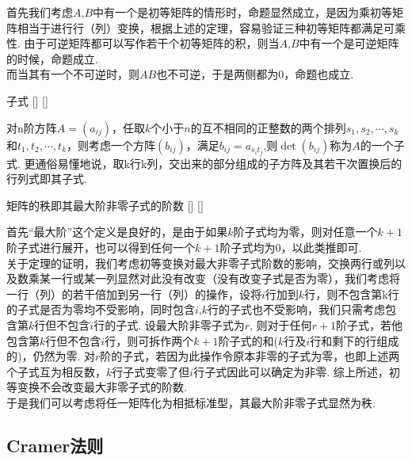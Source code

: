 \documentclass[UTF8]{ctexart}
\begin{document}
    \begin{prf}
        首先我们考虑$A$,$B$中有一个是初等矩阵的情形时，命题显然成立，是因为乘初等矩阵相当于进行行（列）变换，根据上述的定理，容易验证三种初等矩阵都满足可乘性. 由于可逆矩阵都可以写作若干个初等矩阵的积，则当$A$,$B$中有一个是可逆矩阵的时候，命题成立.\\
        而当其有一个不可逆时，则$AB$也不可逆，于是两侧都为0，命题也成立.
        
    \end{prf}
    \begin{dfn}
			[]
			{子式}
			[]
			[]

        对n阶方阵$A=(a_{ij})$，任取$k$个小于$n$的互不相同的正整数的两个排列$s_{1},s_2,\cdots,s_k$和$t_1,t_2,\cdots,t_k$，则考虑一个方阵$(b_{ij})$，满足$b_{ij}=a_{s_it_j}$,则$\det(b_{ij})$称为$A$的一个子式. 更通俗易懂地说，取k行k列，交出来的部分组成的子方阵及其若干次置换后的行列式即其子式.
    \end{dfn}
    \begin{thm}
			[]
			{矩阵的秩即其最大阶非零子式的阶数}
			[]
			[]

    \end{thm}
    \begin{prf}
        首先“最大阶”这个定义是良好的，是由于如果$k$阶子式均为零，则对任意一个$k+1$阶子式进行展开，也可以得到任何一个$k+1$阶子式均为0，以此类推即可.\\
        关于定理的证明，我们考虑初等变换对最大非零子式阶数的影响，交换两行或列以及数乘某一行或某一列显然对此没有改变（没有改变子式是否为零），我们考虑将一行（列）的若干倍加到另一行（列）的操作，设将$i$行加到$k$行，则不包含第k行的子式是否为零均不受影响，同时包含$i$,$k$行的子式也不受影响，我们只需考虑包含第$k$行但不包含$i$行的子式. 设最大阶非零子式为$r$, 则对于任何$r+1$阶子式，若他包含第$k$行但不包含$i$行，则可拆作两个$k+1$阶子式的和($k$行及$i$行和剩下的行组成的)，仍然为零. 对$r$阶的子式，若因为此操作令原本非零的子式为零，也即上述两个子式互为相反数，$k$行子式变零了但$i$行子式因此可以确定为非零. 综上所述，初等变换不会改变最大非零子式的阶数.\\
        于是我们可以考虑将任一矩阵化为相抵标准型，其最大阶非零子式显然为秩.
    \end{prf}


	\subsection{Cramer法则}
		
\end{document}
